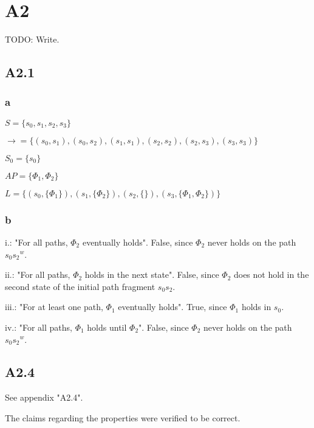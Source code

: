 
\section{A2}

TODO: Write.

\subsection{A2.1}

\subsubsection{a}

$S = \{s_0, s_1, s_2, s_3\}$

$\rightarrow = \{
  (s_0, s_1), (s_0, s_2),
  (s_1, s_1),
  (s_2, s_2), (s_2, s_3),
  (s_3, s_3)
\}$

$S_0 = \{s_0\}$

$AP = \{\Phi_1, \Phi_2\}$

$L = \{
  (s_0, \{\Phi_1\}),
  (s_1, \{\Phi_2\}),
  (s_2, \{\}),
  (s_3, \{\Phi_1, \Phi_2\})
\}$

\subsubsection{b}

i.: "For all paths, $\Phi_2$ eventually holds". False, since $\Phi_2$ never holds on the path $s_0{s_2}^w$.

ii.: "For all paths, $\Phi_2$ holds in the next state". False, since $\Phi_2$ does not hold
     in the second state of the initial path fragment $s_0s_2$.

iii.: "For at least one path, $\Phi_1$ eventually holds". True, since $\Phi_1$ holds in $s_0$.

iv.: "For all paths, $\Phi_1$ holds until $\Phi_2$". False, since $\Phi_2$ never holds on the path $s_0{s_2}^w$.

\subsection{A2.4}

See appendix "A2.4".

The claims regarding the properties were verified to be correct.

